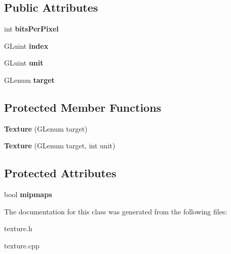\subsection*{Public Attributes}
\begin{DoxyCompactItemize}
\item 
\hypertarget{classg2c_1_1_texture_a2b89faead5e4f502145ec5956761e584}{
int {\bfseries bitsPerPixel}}
\label{classg2c_1_1_texture_a2b89faead5e4f502145ec5956761e584}

\item 
\hypertarget{classg2c_1_1_texture_adaa9e5c89ebb48ff7b7a8c1fdef7cf47}{
GLuint {\bfseries index}}
\label{classg2c_1_1_texture_adaa9e5c89ebb48ff7b7a8c1fdef7cf47}

\item 
\hypertarget{classg2c_1_1_texture_a6856a6c3123e7e460d42d5271b972075}{
GLuint {\bfseries unit}}
\label{classg2c_1_1_texture_a6856a6c3123e7e460d42d5271b972075}

\item 
\hypertarget{classg2c_1_1_texture_aeb86198c4a40480939cc1f9301358b00}{
GLenum {\bfseries target}}
\label{classg2c_1_1_texture_aeb86198c4a40480939cc1f9301358b00}

\end{DoxyCompactItemize}
\subsection*{Protected Member Functions}
\begin{DoxyCompactItemize}
\item 
\hypertarget{classg2c_1_1_texture_ab23136f9906ebf166ddb24e7f4f0f33d}{
{\bfseries Texture} (GLenum target)}
\label{classg2c_1_1_texture_ab23136f9906ebf166ddb24e7f4f0f33d}

\item 
\hypertarget{classg2c_1_1_texture_a29144eec65a861ffd1b5bc338702d3d2}{
{\bfseries Texture} (GLenum target, int unit)}
\label{classg2c_1_1_texture_a29144eec65a861ffd1b5bc338702d3d2}

\end{DoxyCompactItemize}
\subsection*{Protected Attributes}
\begin{DoxyCompactItemize}
\item 
\hypertarget{classg2c_1_1_texture_a9db4665866938aeb9b5cec76371ef4ac}{
bool {\bfseries mipmaps}}
\label{classg2c_1_1_texture_a9db4665866938aeb9b5cec76371ef4ac}

\end{DoxyCompactItemize}


The documentation for this class was generated from the following files:\begin{DoxyCompactItemize}
\item 
texture.h\item 
texture.cpp\end{DoxyCompactItemize}
